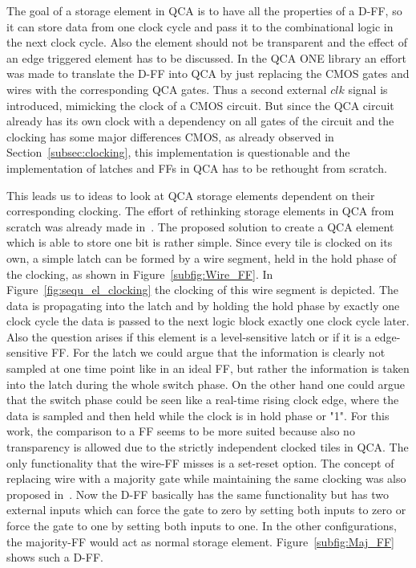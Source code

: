 The goal of a storage element in QCA is to have all the properties of a D-FF, so it can store data from one clock cycle and pass it to the combinational logic in the next clock cycle. Also the element should not be transparent and the effect of an edge triggered element has to be discussed. In the QCA ONE library an effort was made to translate the D-FF into QCA by just replacing the CMOS gates and wires with the corresponding QCA gates. Thus a second external $clk$ signal is introduced, mimicking the clock of a CMOS circuit. But since the QCA circuit already has its own clock with a dependency on all gates of the circuit and the clocking has some major differences CMOS, as already observed in Section~\ref{subsec:clocking}, this implementation is questionable and the implementation of latches and FFs in QCA has to be rethought from scratch.

This leads us to ideas to look at QCA storage elements dependent on their corresponding clocking.
The effort of rethinking storage elements in QCA from scratch was already made in~\cite{torres2018synchronization}. The proposed solution to create a QCA element which is able to store one bit is rather simple. Since every tile is clocked on its own, a simple latch can be formed by a wire segment, held in the hold phase of the clocking, as shown in Figure~\ref{subfig:Wire_FF}. In Figure~\ref{fig:sequ_el_clocking} the clocking of this wire segment is depicted. The data is propagating into the latch and by holding the hold phase by exactly one clock cycle the data is passed to the next logic block exactly one clock cycle later. Also the question arises if this element is a level-sensitive latch or if it is a edge-sensitive FF. For the latch we could argue that the information is clearly not sampled at one time point like in an ideal FF, but rather the information is taken into the latch during the whole switch phase. On the other hand one could argue that the switch phase could be seen like a real-time rising clock edge, where the data is sampled and then held while the clock is in hold phase or "1". For this work, the comparison to a FF seems to be more suited because also no transparency is allowed due to the strictly independent clocked tiles in QCA. The only functionality that the wire-FF misses is a set-reset option. The concept of replacing wire with a majority gate while maintaining the same clocking was also proposed in~\cite{torres2018synchronization}. Now the D-FF basically has the same functionality but has two external inputs which can force the gate to zero by setting both inputs to zero or force the gate to one by setting both inputs to one. In the other configurations, the majority-FF would act as normal storage element. Figure~\ref{subfig:Maj_FF} shows such a D-FF.

